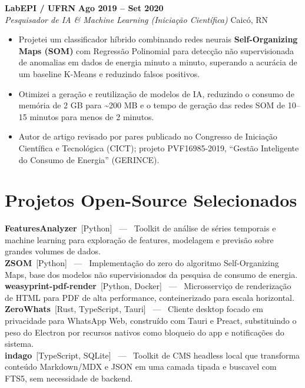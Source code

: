 \documentclass[11pt,a4paper]{article}
\newcommand{\role}[4]{%
  \needspace{5\baselineskip}%
  \textbf{#1} \hfill \textbf{#3} \\[2pt]
  \textit{#2} \hfill \textcolor{muted}{#4}\\[4pt]
}
\newcommand{\project}[3]{%
  \textbf{#1} \,\textcolor{muted}{\small[#2]} \, --- \, #3 \\[3pt]
}
\begin{document}
\role{LabEPI / UFRN}{Pesquisador de IA \& Machine Learning (Inicia\c{c}\~ao Cient\'ifica)}{Ago 2019 -- Set 2020}{Caic\'o, RN}
\begin{itemize}[leftmargin=14pt, itemsep=2pt, topsep=0pt]
    \item Projetei um classificador h\'ibrido combinando redes neurais \textbf{Self-Organizing Maps (SOM)} com Regress\~ao Polinomial para detec\c{c}\~ao n\~ao supervisionada de anomalias em dados de energia minuto a minuto, superando a acur\'acia de um baseline K-Means e reduzindo falsos positivos.
    \item Otimizei a gera\c{c}\~ao e reutiliza\c{c}\~ao de modelos de IA, reduzindo o consumo de mem\'oria de 2 GB para \textasciitilde200 MB e o tempo de gera\c{c}\~ao das redes SOM de 10--15 minutos para menos de 2 minutos.
    \item Autor de artigo revisado por pares publicado no Congresso de Inicia\c{c}\~ao Cient\'ifica e Tecnol\'ogica (CICT); projeto PVF16985-2019, ``Gest\~ao Inteligente do Consumo de Energia'' (GERINCE).
\end{itemize}

\section{Projetos Open-Source Selecionados}

\project{FeaturesAnalyzer}{Python}{Toolkit de an\'alise de s\'eries temporais e machine learning para explora\c{c}\~ao de features, modelagem e previs\~ao sobre grandes volumes de dados.}
\project{ZSOM}{Python}{Implementa\c{c}\~ao do zero do algoritmo Self-Organizing Maps, base dos modelos n\~ao supervisionados da pesquisa de consumo de energia.}
\project{weasyprint-pdf-render}{Python, Docker}{Microsservi\c{c}o de renderiza\c{c}\~ao de HTML para PDF de alta performance, conteinerizado para escala horizontal.}
\project{ZeroWhats}{Rust, TypeScript, Tauri}{Cliente desktop focado em privacidade para WhatsApp Web, constru\'ido com Tauri e Preact, substituindo o peso do Electron por recursos nativos como bloqueio do app e notifica\c{c}\~oes do sistema.}
\project{indago}{TypeScript, SQLite}{Toolkit de CMS headless local que transforma conte\'udo Markdown/MDX e JSON em uma camada tipada e buscavel com FTS5, sem necessidade de backend.}
\vspace{-10pt}
\end{document}
